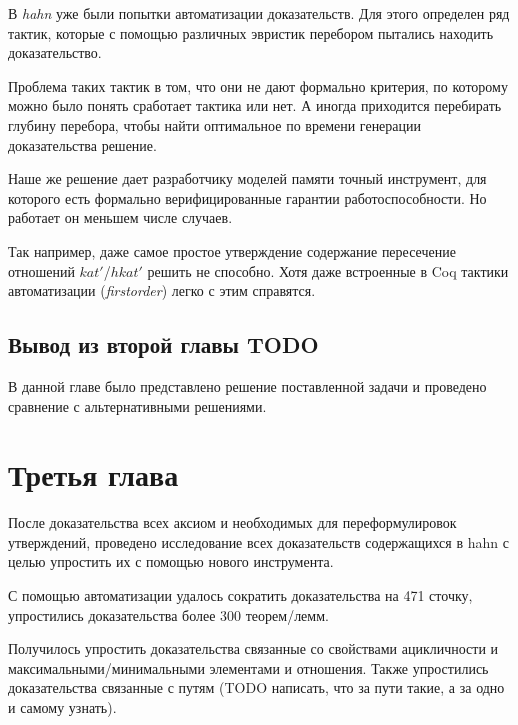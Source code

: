 \documentclass[times
              ]{itmo-student-thesis}
\begin{document}
    В \textit{hahn} уже были попытки автоматизации доказательств.
    Для этого определен ряд тактик, которые с помощью различных эвристик перебором пытались находить доказательство.

    Проблема таких тактик в том, что они не дают формально критерия, по которому можно было понять сработает тактика или нет.
    А иногда приходится перебирать глубину перебора, чтобы найти оптимальное по времени генерации доказательства решение.

    Наше же решение дает разработчику моделей памяти точный инструмент, для которого есть формально верифицированные гарантии работоспособности.
    Но работает он меньшем числе случаев.

    Так например, даже самое простое утверждение содержание пересечение отношений $ kat' $/$ hkat' $ решить не способно.
    Хотя даже встроенные в Coq тактики автоматизации (\textit{firstorder}) легко с этим справятся.

  \section{Вывод из второй главы TODO}
    В данной главе было представлено решение поставленной задачи и проведено сравнение с альтернативными решениями.

\chapter{Третья глава}

  После доказательства всех аксиом и необходимых для переформулировок утверждений,
  проведено исследование всех доказательств содержащихся в hahn с целью упростить их с помощью нового инструмента.

  С помощью автоматизации удалось сократить доказательства на 471 сточку, упростились доказательства более 300 теорем/лемм.

  Получилось упростить доказательства связанные со свойствами ацикличности и максимальными/минимальными элементами и отношения.
  Также упростились доказательства связанные с путям (TODO написать, что за пути такие, а за одно и самому узнать).
\end{document}
